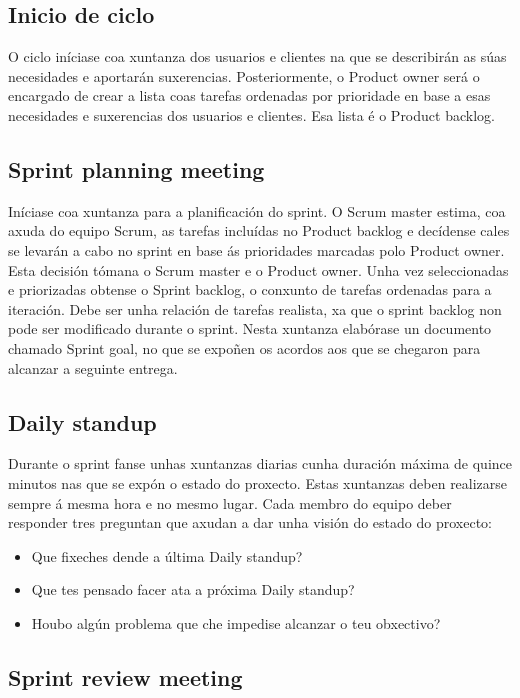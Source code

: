 \subsection{Inicio de ciclo}

O ciclo iníciase coa xuntanza dos usuarios e clientes na que se describirán as súas necesidades e aportarán suxerencias. Posteriormente, o Product owner será o encargado de crear a lista coas tarefas ordenadas por prioridade en base a esas necesidades e suxerencias dos usuarios e clientes. Esa lista é o Product backlog.

\subsection{Sprint planning meeting}

Iníciase coa xuntanza para a planificación do sprint. O Scrum master estima, coa axuda do equipo Scrum, as tarefas incluídas no Product backlog e decídense cales se levarán a cabo no sprint en base ás prioridades marcadas polo Product owner. Esta decisión tómana o Scrum master e o Product owner. Unha vez seleccionadas e priorizadas obtense o Sprint backlog, o conxunto de tarefas ordenadas para a iteración. Debe ser unha relación de tarefas realista, xa que o sprint backlog non pode ser modificado durante o sprint.
Nesta xuntanza elabórase un documento chamado Sprint goal, no que se expoñen os acordos aos que se chegaron para alcanzar a seguinte entrega.

\subsection{Daily standup}

Durante o sprint fanse unhas xuntanzas diarias cunha duración máxima de quince minutos nas que se expón o estado do proxecto. Estas xuntanzas deben realizarse sempre á mesma hora e no mesmo lugar. Cada membro do equipo deber responder tres preguntan que axudan a dar unha visión do estado do proxecto:

\begin{itemize}
	\item Que fixeches dende a última Daily standup?
	\item Que tes pensado facer ata a próxima Daily standup?
	\item Houbo algún problema que che impedise alcanzar o teu obxectivo?
\end{itemize}

\subsection{Sprint review meeting}


